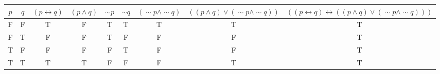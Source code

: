 \begin{tabular}{|c|c||c|c|c|c|c|c|c|}
\hline
$ p $ & $ q $ & $ (p \leftrightarrow q) $ & $ (p \wedge q) $ & $  \sim p $ & $  \sim q $ & $ ( \sim p \wedge  \sim q) $ & $ ((p \wedge q) \vee ( \sim p \wedge  \sim q)) $ & $ ((p \leftrightarrow q) \leftrightarrow ((p \wedge q) \vee ( \sim p \wedge  \sim q))) $ \\
\hline
F & F & T & F & T & T & T & T & T \\
F & T & F & F & T & F & F & F & T \\
T & F & F & F & F & T & F & F & T \\
T & T & T & T & F & F & F & T & T \\
\hline
\end{tabular}
